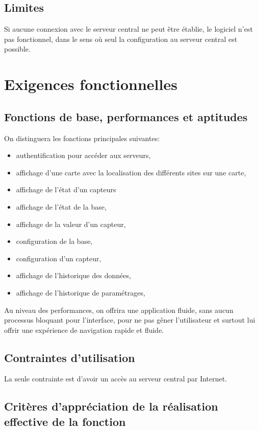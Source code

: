 \subsection{Limites}
Si aucune connexion avec le serveur central ne peut être établie, le logiciel n'est pas fonctionnel, dans le sens où seul la configuration au serveur central est possible.

\section{Exigences fonctionnelles}
\subsection{Fonctions de base, performances et aptitudes}
On distinguera les fonctions principales suivantes:
\begin{itemize}
	\item authentification pour accéder aux serveurs,
	\item affichage d'une carte avec la localisation des différents sites sur une carte,
	\item affichage de l'état d'un capteurs
	\item affichage de l'état de la base,
	\item affichage de la valeur d'un capteur,
	\item configuration de la base,
	\item configuration d'un capteur,
	\item affichage de l'historique des données,
	\item affichage de l'historique de paramétrages,
\end{itemize}

Au niveau des performances, on offrira une application fluide, sans aucun processus bloquant pour l'interface, pour ne pas gêner l'utilisateur et surtout lui offrir une expérience de navigation rapide et fluide.

\subsection{Contraintes d'utilisation}
La seule contrainte est d'avoir un accès au serveur central par Internet.

\subsection{Critères d'appréciation de la réalisation effective de la fonction}

